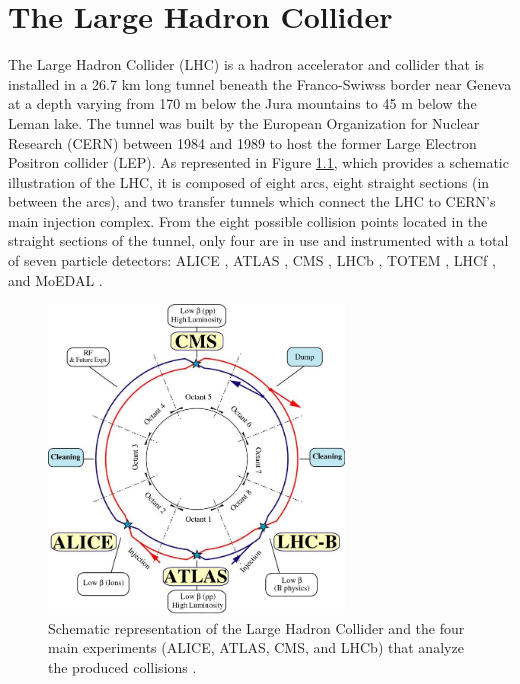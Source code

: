 
\chapter{The Large Hadron Collider}
\label{chap:I-2-lhc}

	The Large Hadron Collider (LHC) \cite{Evans:2008zzb} is a hadron accelerator and collider that is installed in a 26.7 km long tunnel beneath the Franco-Swiwss border near Geneva at a depth varying from 170 m below the Jura mountains to 45 m below the Leman lake. The tunnel was built by the European Organization for Nuclear Research (CERN) between 1984 and 1989 to host the former Large Electron Positron collider (LEP). As represented in Figure \ref{fig:I-2-lhc-schematic}, which provides a schematic illustration of the LHC, it is composed of eight arcs, eight straight sections (in between the arcs), and two transfer tunnels which connect the LHC to CERN's main injection complex. From the eight possible collision points located in the straight sections of the tunnel, only four are in use and instrumented with a total of seven particle detectors: ALICE \cite{1748-0221-3-08-S08002}, ATLAS \cite{1748-0221-3-08-S08003}, CMS \cite{1748-0221-3-08-S08004}, LHCb \cite{1748-0221-3-08-S08005}, TOTEM \cite{1748-0221-3-08-S08007}, LHCf \cite{1748-0221-3-08-S08006}, and MoEDAL \cite{Acharya:2014nyr}. \\

	\begin{figure}[h!]
		\centering
		\includegraphics[width=0.7\textwidth]{img/I-2-lhc/lhc.jpg}
		\caption{Schematic representation of the Large Hadron Collider and the four main experiments (ALICE, ATLAS, CMS, and LHCb) that analyze the produced collisions \cite{Evans:2008zzb}.}
		\label{fig:I-2-lhc-schematic}
	\end{figure}

